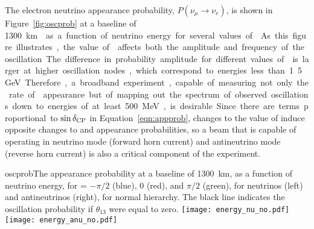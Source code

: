 The electron neutrino appearance probability, $P(\nu_\mu \rightarrow \nu_e)$, 
is shown in 
Figure~\ref{fig:oscprob} 
at a baseline of \SI{1300}\km{} as a function of neutrino 
energy for several values of \deltacp. As this figure illustrates, the value 
of \deltacp affects both the amplitude and frequency of
the oscillation. The difference in probability amplitude
for different values of \deltacp is larger at higher oscillation nodes, which 
correspond to energies less than 1.5~GeV. Therefore, a broadband experiment, 
capable of measuring not only the rate of \nue appearance but of mapping out the 
spectrum of observed oscillations down to energies of at least 500~MeV, 
is desirable. Since there are terms proportional to $\sin\mdeltacp$ in Equation~\ref{eqn:appprob},
changes to the value of \deltacp induce opposite changes to \nue and
\anue appearance probabilities, so a beam that is capable of operating in
neutrino mode (forward horn current) and antineutrino mode (reverse horn current)
is also a critical component of the experiment.

\begin{cdrfigure}{oscprob}{The appearance probability at a baseline of 1300~km,
  as a function of neutrino energy, for \deltacp = $-\pi/2$ (blue), 
  0 (red), and $\pi/2$ (green), for neutrinos (left) and antineutrinos
  (right), for normal hierarchy. The black line indicates the oscillation
  probability if $\theta_{13}$ were equal to zero.}
\texttt{[image: energy\_nu\_no.pdf]}
\texttt{[image: energy\_anu\_no.pdf]}
\end{cdrfigure}

